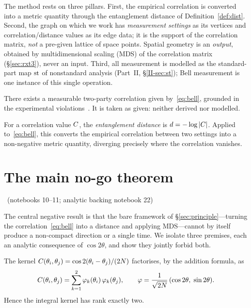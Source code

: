 \documentclass[11pt]{article}
\begin{document}
The method rests on three pillars. First, the empirical correlation is converted into a
metric quantity through the entanglement distance of Definition~\ref{def:dist}. Second,
the graph on which we work has \emph{measurement settings} as its vertices and
correlation/distance values as its edge data; it is the support of the correlation
matrix, \emph{not} a pre-given lattice of space points. Spatial geometry is an
\emph{output}, obtained by multidimensional scaling (MDS) of the correlation matrix
(\S\ref{sec:rxt3}), never an input. Third, all measurement is modelled as the
standard-part map $\operatorname{st}$ of nonstandard analysis (Part~II, \S\ref{II-sec:st}); Bell
measurement is one instance of this single operation.

\begin{principle}\label{prin:bell}
There exists a measurable two-party correlation given by~\eqref{eq:bell}, grounded in the
experimental violations~\cite{freedman-clauser,aspect1982,aspect1982tv,weihs-zeilinger}.
It is taken as given: neither derived nor modelled.
\end{principle}

\begin{definition}\label{def:dist}
For a correlation value $C$, the \emph{entanglement distance} is
$d=-\log|C|$. Applied to~\eqref{eq:bell}, this converts the empirical correlation
between two settings into a non-negative metric quantity, diverging precisely where the
correlation vanishes.
\end{definition}

\section{The main no-go theorem}\label{sec:nogo}
\established\ (notebooks 10--11; analytic backing notebook 22)

The central negative result is that the bare framework of \S\ref{sec:principle}---turning
the correlation~\eqref{eq:bell} into a distance and applying MDS---cannot by itself
produce a non-compact direction or a single time. We isolate three premises, each an
analytic consequence of $\cos2\theta$, and show they jointly forbid both.

\begin{lemma}\label{lem:rank2}
The kernel $C(\theta_i,\theta_j)=\cos 2(\theta_i-\theta_j)/(2N)$ factorises, by the
addition formula, as
\begin{equation}
C(\theta_i,\theta_j)=\sum_{k=1}^{2}\varphi_k(\theta_i)\,\varphi_k(\theta_j),
\qquad \varphi=\frac{1}{\sqrt{2N}}\,(\cos2\theta,\;\sin2\theta).
\label{eq:factor}
\end{equation}
Hence the integral kernel has rank exactly two.
\end{lemma}
\end{document}
